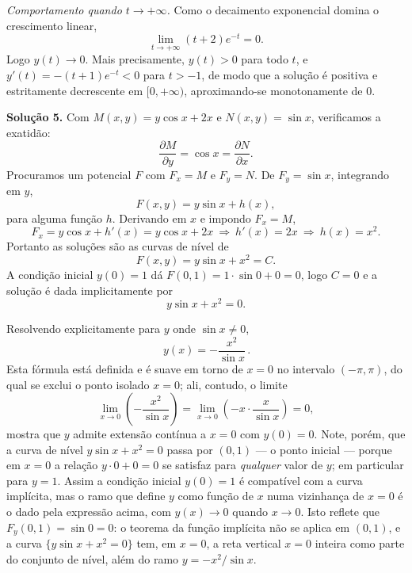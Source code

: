 \emph{Comportamento quando $t\to+\infty$.} Como o decaimento exponencial domina o crescimento linear,
\[
\lim_{t\to+\infty}(t+2)e^{-t}=0.
\]
Logo $y(t)\to 0$. Mais precisamente, $y(t)>0$ para todo $t$, e $y'(t)=-(t+1)e^{-t}<0$ para $t>-1$, de modo que a solução é positiva e estritamente decrescente em $[0,+\infty)$, aproximando-se monotonamente de $0$.

\bigskip\noindent\textbf{Solução 5.}\quad
Com $M(x,y)=y\cos x+2x$ e $N(x,y)=\sin x$, verificamos a exatidão:
\[
\frac{\partial M}{\partial y}=\cos x=\frac{\partial N}{\partial x}.
\]
Procuramos um potencial $F$ com $F_x=M$ e $F_y=N$. De $F_y=\sin x$, integrando em $y$,
\[
F(x,y)=y\sin x+h(x),
\]
para alguma função $h$. Derivando em $x$ e impondo $F_x=M$,
\[
F_x=y\cos x+h'(x)=y\cos x+2x\ \Longrightarrow\ h'(x)=2x\ \Longrightarrow\ h(x)=x^2.
\]
Portanto as soluções são as curvas de nível de
\[
F(x,y)=y\sin x+x^2=C.
\]
A condição inicial $y(0)=1$ dá $F(0,1)=1\cdot \sin 0+0=0$, logo $C=0$ e a solução é dada implicitamente por
\[
y\sin x+x^2=0.
\]

Resolvendo explicitamente para $y$ onde $\sin x\neq 0$,
\[
\boxed{\,y(x)=-\frac{x^2}{\sin x}\,}.
\]
Esta fórmula está definida e é suave em torno de $x=0$ no intervalo $(-\pi,\pi)$, do qual se exclui o ponto isolado $x=0$; ali, contudo, o limite
\[
\lim_{x\to 0}\left(-\frac{x^2}{\sin x}\right)=\lim_{x\to 0}\left(-x\cdot\frac{x}{\sin x}\right)=0,
\]
mostra que $y$ admite extensão contínua a $x=0$ com $y(0)=0$. Note, porém, que a curva de nível $y\sin x+x^2=0$ passa por $(0,1)$ — o ponto inicial — porque em $x=0$ a relação $y\cdot 0+0=0$ se satisfaz para \emph{qualquer} valor de $y$; em particular para $y=1$. Assim a condição inicial $y(0)=1$ é compatível com a curva implícita, mas o ramo que define $y$ como função de $x$ numa vizinhança de $x=0$ é o dado pela expressão acima, com $y(x)\to 0$ quando $x\to 0$. Isto reflete que $F_y(0,1)=\sin 0=0$: o teorema da função implícita não se aplica em $(0,1)$, e a curva $\{y\sin x+x^2=0\}$ tem, em $x=0$, a reta vertical $x=0$ inteira como parte do conjunto de nível, além do ramo $y=-x^2/\sin x$.
